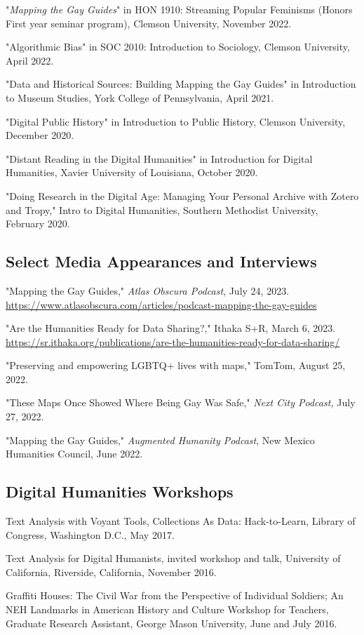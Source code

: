 \documentclass[11pt]{article}
\begin{document}
"\emph{Mapping the Gay Guides}" in HON 1910: Streaming Popular Feminisms (Honors First year seminar program), Clemson University, November 2022. 

"Algorithmic Bias" in SOC 2010: Introduction to Sociology, Clemson University, April 2022.

"Data and Historical Sources: Building Mapping the Gay Guides" in Introduction to Museum Studies, York College of Pennsylvania, April 2021.

"Digital Public History" in Introduction to Public History, Clemson University, December 2020.

"Distant Reading in the Digital Humanities" in Introduction for Digital Humanities, Xavier University of Louisiana, October 2020.

"Doing Research in the Digital Age: Managing Your Personal Archive with Zotero and Tropy," Intro to Digital Humanities, Southern Methodist University, February 2020.

\subsection{Select Media Appearances and Interviews}
"Mapping the Gay Guides," \emph{Atlas Obscura Podcast}, July 24, 2023. \url{https://www.atlasobscura.com/articles/podcast-mapping-the-gay-guides}

"Are the Humanities Ready for Data Sharing?," Ithaka S+R, March 6, 2023. \url{https://sr.ithaka.org/publications/are-the-humanities-ready-for-data-sharing/}

"Preserving and empowering LGBTQ+ lives with maps," TomTom, August 25, 2022.

"These Maps Once Showed Where Being Gay Was Safe," \emph{Next City Podcast,} July 27, 2022.

"Mapping the Gay Guides," \emph{Augmented Humanity Podcast}, New Mexico Humanities Council, June 2022.

\subsection{Digital Humanities Workshops}
Text Analysis with Voyant Tools, Collections As Data: Hack-to-Learn, Library of Congress, Washington D.C., May 2017.

Text Analysis for Digital Humanists, invited workshop and talk, University of California, Riverside, California, November 2016.

Graffiti Houses: The Civil War from the Perspective of Individual Soldiers; An NEH Landmarks in American History and Culture Workshop for Teachers, Graduate Research Assistant, George Mason University, June and July 2016.
\end{document}
